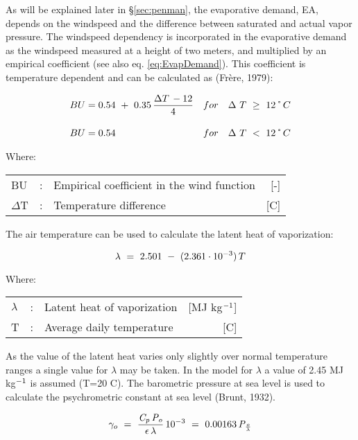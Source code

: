 As will be explained later in \S \ref{sec:penman}, the evaporative demand, EA, depends on the 
windspeed and the difference between saturated and actual vapor pressure. The windspeed
dependency is incorporated in the evaporative demand as the windspeed measured at a
height of two meters, and multiplied by an empirical coefficient (see also eq. 
\ref{eq:EvapDemand}). This
coefficient is temperature dependent and can be calculated as (Fr\`{e}re, 1979):

\begin{align}
\label{eq:BU}
BU &= 0.54 ~+ ~0.35\,{\frac{\Delta T\, - 12}{4}} & for~~~\Delta ~ T~\ge ~ 12 \degrees C \\[1em]
\nonumber
BU &= 0.54 & for~~~\Delta ~ T~<~12 \degrees C
\end{align}

Where:\\[5pt]
\begin{tabularx}{\textwidth}{llXr}
	BU & :& Empirical coefficient in the wind function &  [-]\\
	$\Delta$T& :& Temperature difference & [\textdegree C] \\
\end{tabularx}
\hspace*{6em}

The air temperature can be used to calculate the latent heat of vaporization: 

\begin{equation}
{\it \lambda} ~=~ 2.501~ -~ (2.361 \cdot 10^{-3} )\, T
\end{equation}

Where:\\[5pt]
\begin{tabularx}{\textwidth}{llXr}
	$\lambda$& :& Latent heat of vaporization & [MJ kg$^{{\rm -1}}$]\\
	T &:& Average daily temperature & [\textdegree C]\\
\end{tabularx}


As the value of the latent heat varies only slightly over normal temperature ranges a
single value for $\lambda$ may be taken. In the model for $\lambda$ a value of 2.45 MJ 
kg$^{{\rm -1}}$ is assumed (T=20 \textdegree C). The barometric pressure at sea level is 
used to calculate the psychrometric constant at sea level (Brunt, 1932).

\begin{equation}
\gamma _{o} ~=~ {{\frac{\it C _{p} \, P _{o} }{{\it  \epsilon \, \lambda } }} }\, 10 ^{-3} ~=~ 0.00163\,{\it P} _{\frac{o}{\it \lambda}} 
\end{equation}

